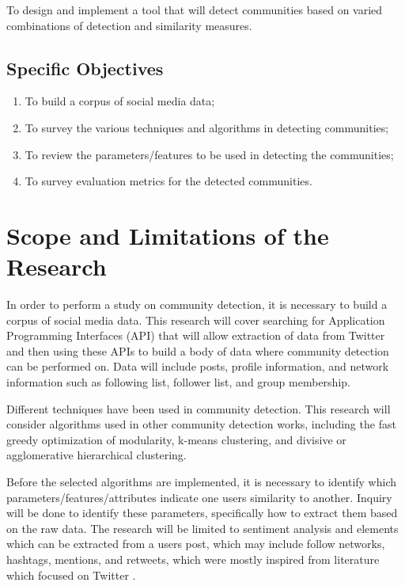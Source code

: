 To design and implement a tool that will detect communities based on varied combinations of detection and similarity measures.




\subsection{Specific Objectives}
\label{sec:specificobjectives}




\begin{enumerate}
	\item To build a corpus of social media data;
	\item To survey the various techniques and algorithms in detecting communities;
	\item To review the parameters/features to be used in detecting the communities;
	\item To survey evaluation metrics for the detected communities.
\end{enumerate}




\section{Scope and Limitations of the Research}
\label{sec:scopelimitations}




In order to perform a study on community detection, it is necessary to build a corpus of social media data. This research will cover searching for Application Programming Interfaces (API) that will allow extraction of data from Twitter and then using these APIs to build a body of data where community detection can be performed on. Data will include posts, profile information, and network information such as following list, follower list, and group membership.




Different techniques have been used in community detection. This research will consider algorithms used in other community detection works, including the fast greedy optimization of modularity, k-means clustering, and divisive or agglomerative hierarchical clustering.




Before the selected algorithms are implemented, it is necessary to identify which parameters/features/attributes indicate one user\vtick s similarity to another. Inquiry will be done to identify these parameters, specifically how to extract them based on the raw data. The research will be limited to sentiment analysis and elements which can be extracted from a user\vtick s post, which may include follow networks, hashtags, mentions, and retweets, which were mostly inspired from literature which focused on Twitter \cite{Deitrick:2013,Zhang:2012,Lim:2012:1}. 




